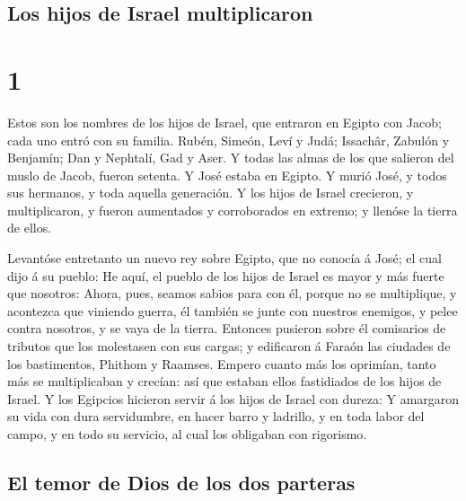 \hypertarget{los-hijos-de-israel-multiplicaron}{%
\subsection{Los hijos de Israel
multiplicaron}\label{los-hijos-de-israel-multiplicaron}}

\hypertarget{section-02-1}{%
\section{1}\label{section-02-1}}

 Estos son los nombres de los hijos de Israel, que
entraron en Egipto con Jacob; cada uno entró con su familia.
 Rubén, Simeón, Leví y Judá;  Issachâr,
Zabulón y Benjamín;  Dan y Nephtalí, Gad y Aser.
 Y todas las almas de los que salieron del muslo de Jacob,
fueron setenta. Y José estaba en Egipto.  Y murió José, y
todos sus hermanos, y toda aquella generación.  Y los
hijos de Israel crecieron, y multiplicaron, y fueron aumentados y
corroborados en extremo; y llenóse la tierra de ellos.

 Levantóse entretanto un nuevo rey sobre Egipto, que no
conocía á José; el cual dijo á su pueblo:  He aquí, el
pueblo de los hijos de Israel es mayor y más fuerte que nosotros:
 Ahora, pues, seamos sabios para con él, porque no se
multiplique, y acontezca que viniendo guerra, él también se junte con
nuestros enemigos, y pelee contra nosotros, y se vaya de la tierra.
 Entonces pusieron sobre él comisarios de tributos que
los molestasen con sus cargas; y edificaron á Faraón las ciudades de los
bastimentos, Phithom y Raamses.  Empero cuanto más los
oprimían, tanto más se multiplicaban y crecían: así que estaban ellos
fastidiados de los hijos de Israel.  Y los Egipcios
hicieron servir á los hijos de Israel con dureza:  Y
amargaron su vida con dura servidumbre, en hacer barro y ladrillo, y en
toda labor del campo, y en todo su servicio, al cual los obligaban con
rigorismo.

\hypertarget{el-temor-de-dios-de-los-dos-parteras}{%
\subsection{El temor de Dios de los dos
parteras}\label{el-temor-de-dios-de-los-dos-parteras}}

